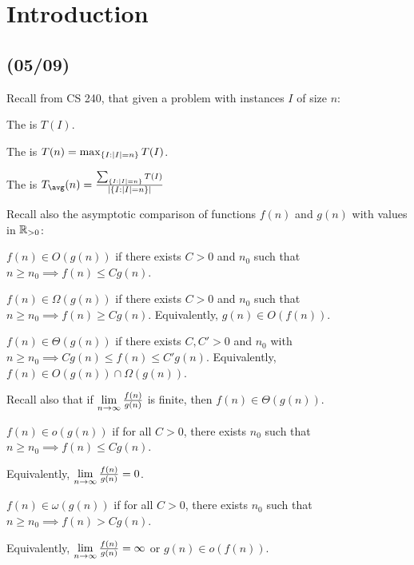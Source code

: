 \chapter{Introduction}
\section{(05/09)}

Recall from CS 240, that given a problem with instances $I$ of size $n$:

\begin{defn*}[runtime]
  The  is $T(I)$.

  The  is $T(n) = \max_{\{I : \abs{I} = n\}} T(I)$.

  The  is $T_{\avg}(n) = \frac{\sum_{\{I : \abs{I} = n\}} T(I)}{\abs{\{I : \abs{I} = n\}}}$
\end{defn*}

Recall also the asymptotic comparison of functions $f(n)$ and $g(n)$
with values in $\mathbb{R}_{>0}$:

\begin{defn}[big-$O$]
  $f(n) \in O(g(n))$ if there exists $C > 0$ and $n_0$
  such that $n \geq n_0 \implies f(n) \leq Cg(n)$.
\end{defn}

\begin{defn}
  $f(n) \in \Omega(g(n))$ if there exists $C > 0$ and $n_0$
  such that $n \geq n_0 \implies f(n) \geq Cg(n)$.
  Equivalently, $g(n) \in O(f(n))$.
\end{defn}

\begin{defn}
  $f(n) \in \Theta(g(n))$ if there exists $C, C' > 0$ and $n_0$
  with $n \geq n_0 \implies Cg(n) \leq f(n) \leq C'g(n)$.
  Equivalently, $f(n) \in O(g(n)) \cap \Omega(g(n))$.

  Recall also that if $\lim\limits_{n\to\infty}\frac{f(n)}{g(n)}$ is finite,
  then $f(n) \in \Theta(g(n))$.
\end{defn}

\begin{defn}[little-$o$]
  $f(n) \in o(g(n))$ if for all $C > 0$, there exists $n_0$
  such that $n \geq n_0 \implies f(n) \leq Cg(n)$.

  Equivalently, $\lim\limits_{n\to\infty}\frac{f(n)}{g(n)} = 0$.
\end{defn}

\begin{defn}
  $f(n) \in \omega(g(n))$ if for all $C > 0$, there exists $n_0$
  such that $n \geq n_0 \implies f(n) > Cg(n)$.

  Equivalently, $\lim\limits_{n\to\infty}\frac{f(n)}{g(n)} = \infty$ or $g(n) \in o(f(n))$.
\end{defn}


